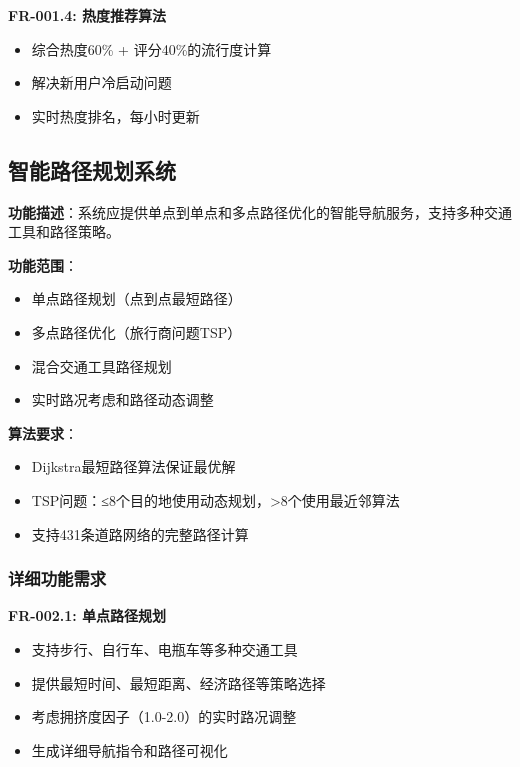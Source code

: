 \documentclass[12pt,a4paper]{article}
\begin{document}
\textbf{FR-001.4: 热度推荐算法}
\begin{itemize}
    \item 综合热度60\% + 评分40\%的流行度计算
    \item 解决新用户冷启动问题
    \item 实时热度排名，每小时更新
\end{itemize}

\subsection{智能路径规划系统}

\begin{reqbox}[title={FR-002: 智能路径规划}]
\textbf{功能描述}：系统应提供单点到单点和多点路径优化的智能导航服务，支持多种交通工具和路径策略。

\textbf{功能范围}：
\begin{itemize}[nosep]
    \item 单点路径规划（点到点最短路径）
    \item 多点路径优化（旅行商问题TSP）
    \item 混合交通工具路径规划
    \item 实时路况考虑和路径动态调整
\end{itemize}

\textbf{算法要求}：
\begin{itemize}[nosep]
    \item Dijkstra最短路径算法保证最优解
    \item TSP问题：≤8个目的地使用动态规划，>8个使用最近邻算法
    \item 支持431条道路网络的完整路径计算
\end{itemize}
\end{reqbox}

\subsubsection{详细功能需求}

\textbf{FR-002.1: 单点路径规划}
\begin{itemize}
    \item 支持步行、自行车、电瓶车等多种交通工具
    \item 提供最短时间、最短距离、经济路径等策略选择
    \item 考虑拥挤度因子（1.0-2.0）的实时路况调整
    \item 生成详细导航指令和路径可视化
\end{itemize}
\end{document}
